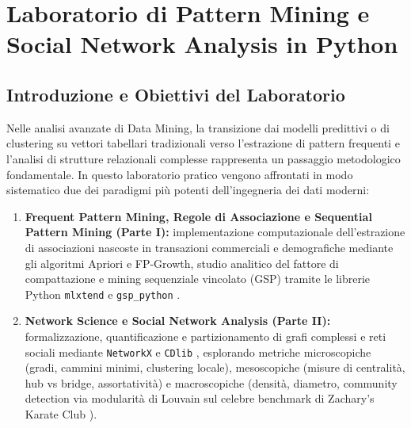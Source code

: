 \FloatBarrier
\section{Laboratorio di Pattern Mining e Social Network Analysis in Python}
\label{chap:lab-pattern-mining-social-network}

\FloatBarrier
\subsection{Introduzione e Obiettivi del Laboratorio}
\label{sec:lab-pm-sna-intro}

Nelle analisi avanzate di Data Mining, la transizione dai modelli predittivi o di clustering su vettori tabellari tradizionali verso l'estrazione di pattern frequenti e l'analisi di strutture relazionali complesse rappresenta un passaggio metodologico fondamentale. In questo laboratorio pratico vengono affrontati in modo sistematico due dei paradigmi più potenti dell'ingegneria dei dati moderni:
\begin{enumerate}
    \item \textbf{Frequent Pattern Mining, Regole di Associazione e Sequential Pattern Mining (Parte I):} implementazione computazionale dell'estrazione di associazioni nascoste in transazioni commerciali e demografiche mediante gli algoritmi Apriori e FP-Growth, studio analitico del fattore di compattazione e mining sequenziale vincolato (GSP) tramite le librerie Python \texttt{mlxtend} \cite{agrawal1994,han2000} e \texttt{gsp\_python} \cite{agrawal1995}.
    \item \textbf{Network Science e Social Network Analysis (Parte II):} formalizzazione, quantificazione e partizionamento di grafi complessi e reti sociali mediante \texttt{NetworkX} \cite{barabasi2016} e \texttt{CDlib} \cite{rossetti2019}, esplorando metriche microscopiche (gradi, cammini minimi, clustering locale), mesoscopiche (misure di centralità, hub vs bridge, assortatività) e macroscopiche (densità, diametro, community detection via modularità di Louvain \cite{blondel2008} sul celebre benchmark di Zachary's Karate Club \cite{zachary1977}).
\end{enumerate}

